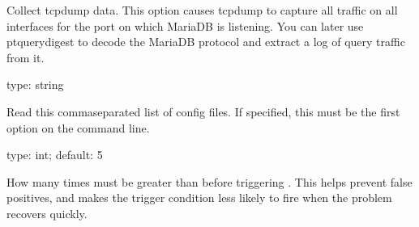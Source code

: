 \documentclass[letterpaper,10pt,english]{sphinxmanual}
\begin{document}
\begin{fulllineitems}
\label{\detokenize{mariadb-stat:cmdoption-mariadb-stat-collect-tcpdump}}
Collect tcpdump data. This option causes tcpdump to capture all traffic on all
interfaces for the port on which MariaDB is listening.  You can later use
pt\sphinxhyphen{}query\sphinxhyphen{}digest to decode the MariaDB protocol and extract a log of query traffic
from it.

\end{fulllineitems}


\begin{fulllineitems}
\label{\detokenize{mariadb-stat:cmdoption-mariadb-stat-config}}
type: string

Read this comma\sphinxhyphen{}separated list of config files.  If specified, this must be the
first option on the command line.

\end{fulllineitems}


\begin{fulllineitems}
\label{\detokenize{mariadb-stat:cmdoption-mariadb-stat-cycles}}
type: int; default: 5

How many times {\hyperref[\detokenize{mariadb-stat:cmdoption-mariadb-stat-variable}]{}} must be greater than {\hyperref[\detokenize{mariadb-stat:cmdoption-mariadb-stat-threshold}]{}} before triggering {\hyperref[\detokenize{mariadb-stat:cmdoption-mariadb-stat-collect}]{}}.  This helps prevent false positives, and makes
the trigger condition less likely to fire when the problem recovers quickly.

\end{fulllineitems}
\end{document}
